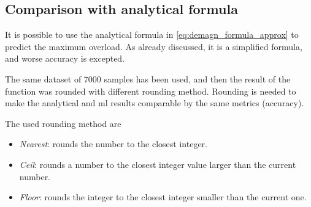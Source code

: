 \subsection{Comparison with analytical formula}
It is possible to use the analytical formula in \cref{eq:demagn_formula_approx} to predict the maximum overload. As already discussed, it is a simplified formula, and worse accuracy is excepted.

The same dataset of $7000$ samples has been used, and then the result of the function was rounded with different rounding method. Rounding is needed to make the analytical and \gls{ml} results comparable by the same metrics (accuracy).

The used rounding method are
\begin{itemize}
    \item \emph{Nearest}: rounds the number to the closest integer.
    \item \emph{Ceil}: rounds a number to the closest integer value larger than the current number.
    \item \emph{Floor}: rounds the integer to the closest integer smaller than the current one.
\end{itemize}

